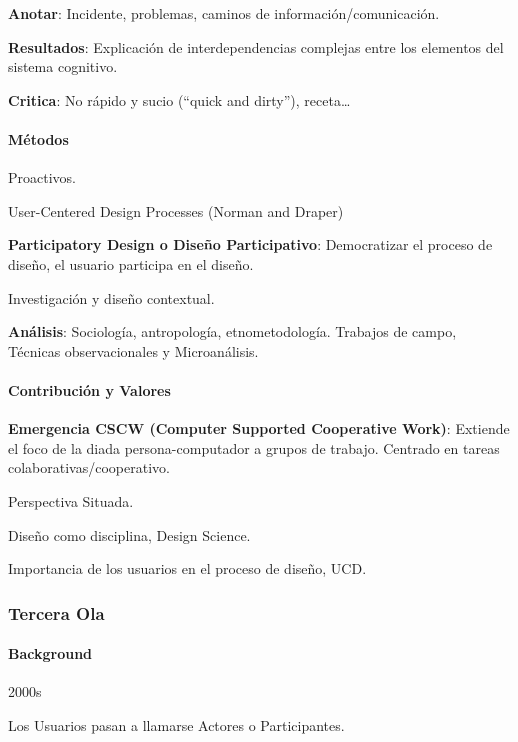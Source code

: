 \documentclass[12pt]{report} %
\begin{document}
\textbf{Anotar}: Incidente, problemas, caminos de
información/comunicación.

\textbf{Resultados}: Explicación de interdependencias complejas entre
los elementos del sistema cognitivo.

\textbf{Critica}: No rápido y sucio (``quick and dirty''),
receta\ldots{}

\hypertarget{muxe9todos-1}{%
\paragraph{Métodos}\label{muxe9todos-1}}

Proactivos.

User-Centered Design Processes (Norman and Draper)

\textbf{Participatory Design o Diseño Participativo}: Democratizar el
proceso de diseño, el usuario participa en el diseño.

Investigación y diseño contextual.

\textbf{Análisis}: Sociología, antropología, etnometodología. Trabajos
de campo, Técnicas observacionales y Microanálisis.

\hypertarget{contribuciuxf3n-y-valores-1}{%
\paragraph{Contribución y Valores}\label{contribuciuxf3n-y-valores-1}}

\textbf{Emergencia CSCW (Computer Supported Cooperative Work)}: Extiende
el foco de la diada persona-computador a grupos de trabajo. Centrado en
tareas colaborativas/cooperativo.

Perspectiva Situada.

Diseño como disciplina, Design Science.

Importancia de los usuarios en el proceso de diseño, UCD.

\hypertarget{tercera-ola}{%
\subsubsection{Tercera Ola}\label{tercera-ola}}

\hypertarget{background-2}{%
\paragraph{Background}\label{background-2}}

2000s

Los Usuarios pasan a llamarse Actores o Participantes.
\end{document}
